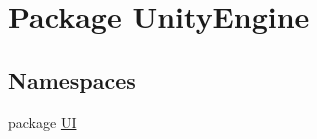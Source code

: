 \hypertarget{namespace_unity_engine}{}\section{Package Unity\+Engine}
\label{namespace_unity_engine}
\subsection*{Namespaces}
\begin{DoxyCompactItemize}
\item 
package \hyperlink{namespace_unity_engine_1_1_u_i}{U\+I}
\end{DoxyCompactItemize}
